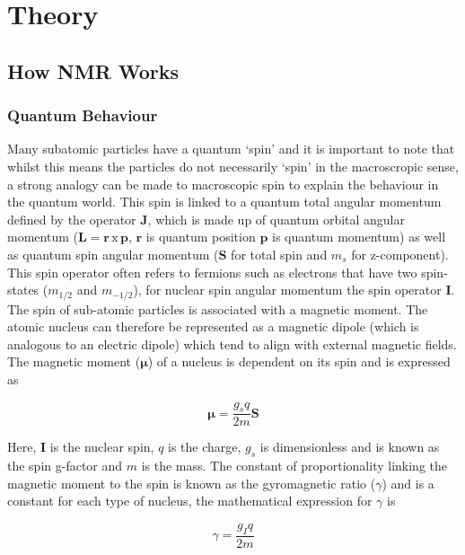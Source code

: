 \chapter{Theory}
\label{Chap:Theory}

\section{How \texorpdfstring{\ac{NMR}}{NMR} Works}
\subsection{Quantum Behaviour}

Many subatomic particles have a quantum `spin' and it is important to note that whilst this means the particles do not necessarily `spin' in the macroscropic sense, a strong analogy can be made to macroscopic spin to explain the behaviour in the quantum world. This spin is linked to a quantum total angular momentum defined by the operator $\mathbf{J}$, which is made up of quantum orbital angular momentum ($\mathbf{L} = \mathbf{r}\, \textrm{x} \, \mathbf{p}$, $\mathbf{r}$ is quantum position $\mathbf{p}$ is quantum momentum) as well as quantum spin angular momentum ($\mathbf{S}$ for total spin and $m_s$ for z-component). This spin operator often refers to fermions such as electrons that have two spin-states ($m_{1/2}$ and $m_{-1/2}$), for nuclear spin angular momentum the spin operator $\mathbf{I}$. The spin of sub-atomic particles is associated with a magnetic moment. The atomic nucleus can therefore be represented as a magnetic dipole (which is analogous to an electric dipole) which tend to align with external magnetic fields. The magnetic moment ($\boldsymbol\mu$) of a nucleus is dependent on its spin and is expressed as

\begin{equation}
    \boldsymbol\mu = \frac{g_sq}{2m} \mathbf{S}
    \label{eqn:theory:moment}
\end{equation}

Here, $\mathbf{I}$ is the nuclear spin, $q$ is the charge, $g_s$ is dimensionless and is known as the spin g-factor and $m$ is the mass. The constant of proportionality linking the magnetic moment to the spin is known as the gyromagnetic ratio ($\gamma$) and is a constant for each type of nucleus, the mathematical expression for $\gamma$ is 

\begin{equation}
    \gamma = \frac{g_Iq}{2m}
    \label{eqn:theory:gyro}
\end{equation}

